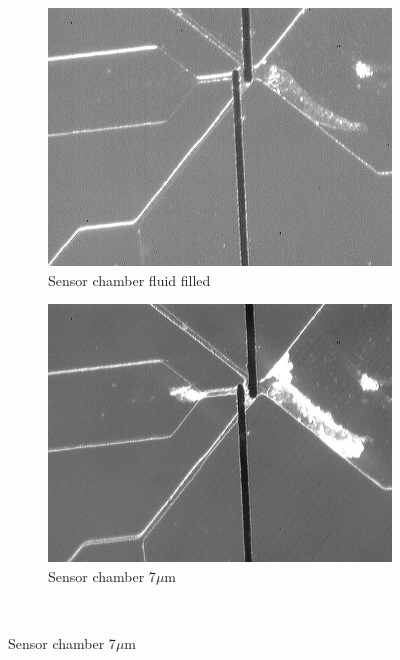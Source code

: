 \begin{figure}[h]
    \centering
    \begin{subfigure}[b]{0.45\textwidth}
        \centering
        \includegraphics[width=\textwidth]{images/IS_empty.jpg}
        \caption{Sensor chamber fluid filled}
    \end{subfigure}
    \hfill
    \begin{subfigure}[b]{0.45\textwidth}
        \centering
        \includegraphics[width=\textwidth]{images/IS_particle_saturation.jpg}
        \caption{Sensor chamber 7$\mu$m }
    \end{subfigure}
    \\
    \vspace{0.1 in}

\end{figure}

